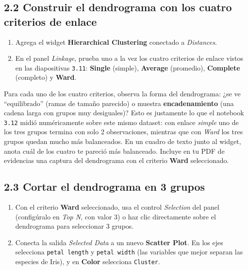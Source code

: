 \documentclass[11pt,letterpaper]{article}
\begin{document}
\subsection{2.2 Construir el dendrograma con los cuatro criterios de enlace}

\begin{enumerate}[leftmargin=1.2cm]
  \item Agrega el widget \textbf{Hierarchical Clustering} conectado a \textit{Distances}.
  \item En el panel \textit{Linkage}, prueba uno a la vez los cuatro criterios de enlace vistos en las diapositivas \texttt{3.11}: \textbf{Single} (simple), \textbf{Average} (promedio), \textbf{Complete} (completo) y \textbf{Ward}.
\end{enumerate}

\begin{actividad}
Para cada uno de los cuatro criterios, observa la forma del dendrograma: ¿se ve ``equilibrado'' (ramas de tamaño parecido) o muestra \textbf{encadenamiento} (una cadena larga con grupos muy desiguales)? Esto es justamente lo que el notebook \texttt{3.12} midió numéricamente sobre este mismo dataset: con enlace \textit{simple} uno de los tres grupos termina con solo 2 observaciones, mientras que con \textit{Ward} los tres grupos quedan mucho más balanceados. En un cuadro de texto junto al widget, anota cuál de los cuatro te pareció más balanceado. Incluye en tu PDF de evidencias una captura del dendrograma con el criterio \textbf{Ward} seleccionado.
\end{actividad}

\subsection{2.3 Cortar el dendrograma en 3 grupos}

\begin{enumerate}[leftmargin=1.2cm]
  \item Con el criterio \textbf{Ward} seleccionado, usa el control \textit{Selection} del panel (configúralo en \textit{Top N}, con valor 3) o haz clic directamente sobre el dendrograma para seleccionar 3 grupos.
  \item Conecta la salida \textit{Selected Data} a un nuevo \textbf{Scatter Plot}. En los ejes selecciona \texttt{petal length} y \texttt{petal width} (las variables que mejor separan las especies de Iris), y en \textbf{Color} selecciona \texttt{Cluster}.
\end{enumerate}
\end{document}
